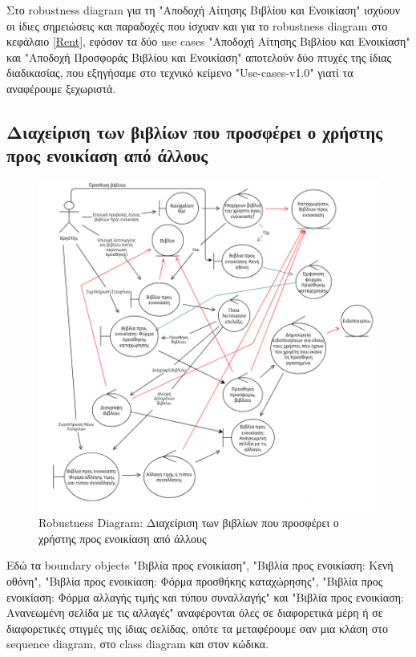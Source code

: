 \documentclass[12pt,a4paper]{article}
\begin{document}
Στο robustness diagram για τη "Αποδοχή Αίτησης Βιβλίου και Ενοικίαση" ισχύουν οι ίδιες σημειώσεις και παραδοχές που ίσχυαν και για το robustness diagram στο κεφάλαιο \ref{Rent}, εφόσον τα δύο use cases "Αποδοχή Αίτησης Βιβλίου και Ενοικίαση" και "Αποδοχή Προσφοράς Βιβλίου και Ενοικίαση" αποτελούν δύο πτυχές της ίδιας διαδικασίας, που εξηγήσαμε στο τεχνικό κείμενο "Use-cases-v1.0" γιατί τα αναφέρουμε ξεχωριστά.

\subsection{Διαχείριση των βιβλίων που προσφέρει ο χρήστης προς ενοικίαση από άλλους}
\begin{figure}[H]
	\includegraphics[width=\textwidth]{Manage User Book Listings Robustness.png}
	\caption{Robustness Diagram: Διαχείριση των βιβλίων που προσφέρει ο χρήστης προς ενοικίαση από άλλους}
	\label{Robustness Diagram: Διαχείριση των βιβλίων που προσφέρει ο χρήστης προς ενοικίαση από άλλους}
\end{figure}

Εδώ τα boundary objects "Βιβλία προς ενοικίαση", "Βιβλία προς ενοικίαση: Κενή οθόνη", "Βιβλία προς ενοικίαση: Φόρμα προσθήκης καταχώρησης", "Βιβλία προς ενοικίαση: Φόρμα αλλαγής τιμής και τύπου συναλλαγής" και "Βιβλία προς ενοικίαση: Ανανεωμένη σελίδα με τις αλλαγές" αναφέρονται όλες σε διαφορετικά μέρη ή σε διαφορετικές στιγμές της ίδιας σελίδας, οπότε τα μεταφέρουμε σαν μια κλάση στο sequence diagram, στο class diagram και στον κώδικα.
\end{document}

